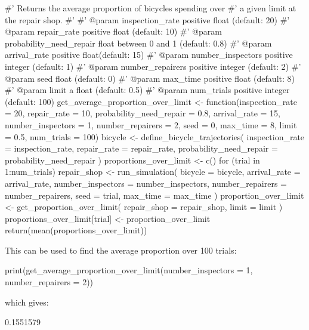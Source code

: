 \begin{Rin}
#' Returns the average proportion of bicycles spending over
#' a given limit at the repair shop.
#'
#' @param inspection_rate positive float (default: 20)
#' @param repair_rate positive float (default: 10)
#' @param probability_need_repair float between 0 and 1 (default: 0.8)
#' @param arrival_rate positive float(default: 15)
#' @param number_inspectors positive integer (default: 1)
#' @param number_repairers positive integer (default: 2)
#' @param seed float (default: 0)
#' @param max_time positive float (default: 8)
#' @param limit a float (default: 0.5)
#' @param num_trials positive integer (default: 100)
get_average_proportion_over_limit <- function(inspection_rate = 20,
                                              repair_rate = 10,
                                              probability_need_repair = 0.8,
                                              arrival_rate = 15,
                                              number_inspectors = 1,
                                              number_repairers = 2,
                                              seed = 0,
                                              max_time = 8,
                                              limit = 0.5,
                                              num_trials = 100) {
  bicycle <- define_bicycle_trajectories(
    inspection_rate = inspection_rate,
    repair_rate = repair_rate,
    probability_need_repair = probability_need_repair
  )
  proportions_over_limit <- c()
  for (trial in 1:num_trials) {
    repair_shop <- run_simulation(
      bicycle = bicycle,
      arrival_rate = arrival_rate,
      number_inspectors = number_inspectors,
      number_repairers = number_repairers,
      seed = trial,
      max_time = max_time
    )
    proportion_over_limit <- get_proportion_over_limit(
      repair_shop = repair_shop,
      limit = limit
    )
    proportions_over_limit[trial] <- proportion_over_limit
  }
  return(mean(proportions_over_limit))
}
\end{Rin}

This can be used to find the average proportion over 100 trials:

\begin{Rin}
print(get_average_proportion_over_limit(number_inspectors = 1, number_repairers = 2))
\end{Rin}

which gives:

\begin{Rout}
[1] 0.1551579
\end{Rout}

